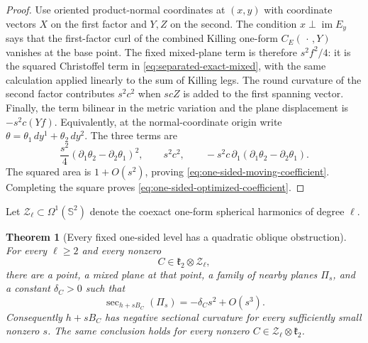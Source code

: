 \documentclass[11pt]{amsart}
\newtheorem{theorem}{Theorem}[section]
\theoremstyle{definition}
\theoremstyle{remark}
\DeclareMathOperator{\secop}{sec}
\newcommand{\Sph}{\mathbb S}
\begin{document}
\begin{proof}
Use oriented product-normal coordinates at $(x,y)$ with coordinate
vectors $X$ on the first factor and $Y,Z$ on the second.  The condition
$x\perp\operatorname{im}E_y$ says that the first-factor curl of the
combined Killing one-form $C_E(\,\cdot\,,Y)$ vanishes at the base
point.  The fixed mixed-plane term is therefore
$s^2f^2/4$: it is the squared Christoffel term in
\eqref{eq:separated-exact-mixed}, with the same calculation applied
linearly to the sum of Killing legs.  The round curvature of the
second factor contributes $s^2c^2$ when $scZ$ is added to the first
spanning vector.  Finally, the term bilinear in the metric variation
and the plane displacement is $-s^2c(Yf)$.  Equivalently, at the
normal-coordinate origin write
$\theta=\theta_1\,dy^1+\theta_2\,dy^2$.  The three terms are
\[
 \frac{s^2}{4}(\partial_1\theta_2-\partial_2\theta_1)^2,
 \qquad s^2c^2,
 \qquad
 -s^2c\,\partial_1
   (\partial_1\theta_2-\partial_2\theta_1).
\]
The squared area is $1+O(s^2)$, proving
\eqref{eq:one-sided-moving-coefficient}.  Completing the square proves
\eqref{eq:one-sided-optimized-coefficient}.
\end{proof}

Let $\mathcal Z_\ell\subset\Omega^1(\Sph^2)$ denote the coexact
one-form spherical harmonics of degree $\ell$.

\begin{theorem}[Every fixed one-sided level has a quadratic oblique obstruction]
\label{thm:one-sided-towers}
For every $\ell\geq2$ and every nonzero
\[
 C\in\mathfrak k_2\otimes\mathcal Z_\ell,
\]
there are a point, a mixed plane at that point, a family of nearby planes
$\Pi_s$, and a constant $\delta_C>0$ such that
\begin{equation}\label{eq:one-sided-negative}
 \secop_{h+sB_C}(\Pi_s)=-\delta_Cs^2+O(s^3).
\end{equation}
Consequently $h+sB_C$ has negative sectional curvature for every
sufficiently small nonzero $s$.  The same conclusion holds for every
nonzero $C\in\mathcal Z_\ell\otimes\mathfrak k_2$.
\end{theorem}
\end{document}
